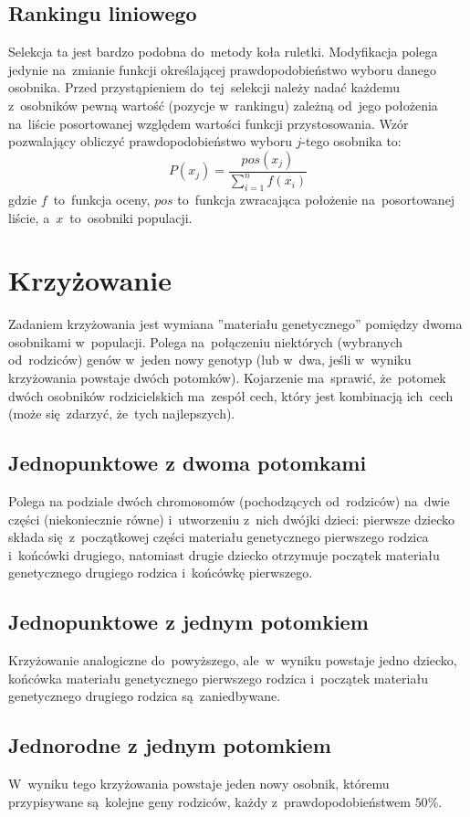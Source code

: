 \documentclass[11pt]{aghdpl}
\begin{document}
\section{Rankingu liniowego}
\label{sec:linear}
Selekcja ta jest bardzo podobna do~metody koła ruletki. Modyfikacja polega jedynie na~zmianie funkcji 
określającej prawdopodobieństwo wyboru danego osobnika. Przed przystąpieniem do~tej~selekcji należy nadać każdemu z~osobników 
pewną wartość (pozycje w~rankingu) zależną od~jego położenia na~liście posortowanej względem wartości funkcji 
przystosowania. Wzór pozwalający obliczyć prawdopodobieństwo wyboru $j$-tego osobnika to:
$$
P(x_j) = \frac{pos(x_j)}{\sum\limits_{i=1}^n{f(x_i)}}
$$
gdzie $f$~to~funkcja oceny, $pos$ to~funkcja zwracająca położenie na~posortowanej liście, a~$x$~to~osobniki populacji.

\chapter{Krzyżowanie}
\label{cha:crossing}
Zadaniem krzyżowania jest wymiana ''materiału genetycznego'' pomiędzy dwoma osobnikami w~populacji. Polega na~połączeniu 
niektórych (wybranych od~rodziców) genów w~jeden nowy genotyp (lub w~dwa, jeśli w~wyniku krzyżowania powstaje dwóch potomków). Kojarzenie ma~sprawić, że~potomek dwóch osobników rodzicielskich 
ma~zespół cech, który jest kombinacją ich~cech (może się~zdarzyć, że~tych najlepszych).

\section{Jednopunktowe z dwoma potomkami}
\label{sec:jedenDwa}
Polega na podziale dwóch chromosomów (pochodzących od~rodziców) na~dwie części (niekoniecznie równe) i~utworzeniu z~nich 
dwójki dzieci: pierwsze dziecko składa się~z~początkowej części materiału genetycznego pierwszego rodzica i~końcówki drugiego, 
natomiast drugie dziecko otrzymuje początek materiału genetycznego drugiego rodzica i~końcówkę pierwszego.

\section{Jednopunktowe z jednym potomkiem}
\label{sec:jedenJeden}
Krzyżowanie analogiczne do~powyższego, ale~w~wyniku powstaje jedno dziecko, końcówka materiału genetycznego pierwszego 
rodzica i~początek materiału genetycznego drugiego rodzica są~zaniedbywane.

\section{Jednorodne z jednym potomkiem}
\label{sec:uniform}
W~wyniku tego krzyżowania powstaje jeden nowy osobnik, któremu przypisywane są~kolejne geny rodziców, każdy z~prawdopodobieństwem $50$\%.
\end{document}
